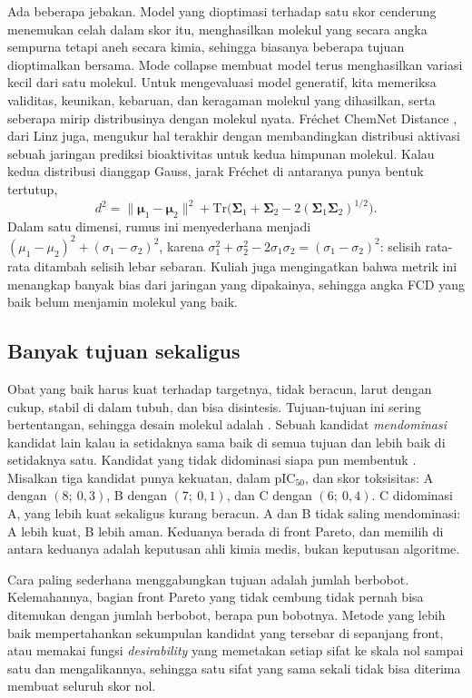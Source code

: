 Ada beberapa jebakan. Model yang dioptimasi terhadap satu skor cenderung menemukan celah dalam skor itu, menghasilkan
molekul yang secara angka sempurna tetapi aneh secara kimia, sehingga biasanya beberapa tujuan dioptimalkan bersama.
Mode collapse membuat model terus menghasilkan variasi kecil dari satu molekul. Untuk mengevaluasi model generatif, kita
memeriksa validitas, keunikan, kebaruan, dan keragaman molekul yang dihasilkan, serta seberapa mirip distribusinya dengan
molekul nyata. Fréchet ChemNet Distance \citep{preuer2018}, dari Linz juga, mengukur hal terakhir dengan membandingkan
distribusi aktivasi sebuah jaringan prediksi bioaktivitas untuk kedua himpunan molekul. Kalau kedua distribusi dianggap
Gauss, jarak Fréchet di antaranya punya bentuk tertutup,
\begin{equation}
d^2=\|\bm\mu_1-\bm\mu_2\|^2+\mathrm{Tr}\big(\bm\Sigma_1+\bm\Sigma_2-2(\bm\Sigma_1\bm\Sigma_2)^{1/2}\big).
\end{equation}
Dalam satu dimensi, rumus ini menyederhana menjadi $(\mu_1-\mu_2)^2+(\sigma_1-\sigma_2)^2$, karena
$\sigma_1^2+\sigma_2^2-2\sigma_1\sigma_2=(\sigma_1-\sigma_2)^2$: selisih rata-rata ditambah selisih lebar sebaran. Kuliah
juga mengingatkan bahwa metrik ini menangkap banyak bias dari jaringan yang dipakainya, sehingga angka FCD yang baik belum
menjamin molekul yang baik.

\subsection{Banyak tujuan sekaligus}

Obat yang baik harus kuat terhadap targetnya, tidak beracun, larut dengan cukup, stabil di dalam tubuh, dan bisa disintesis. Tujuan-tujuan
ini sering bertentangan, sehingga desain molekul adalah . Sebuah kandidat \emph{mendominasi} kandidat
lain kalau ia setidaknya sama baik di semua tujuan dan lebih baik di setidaknya satu. Kandidat yang tidak didominasi siapa pun membentuk
. Misalkan tiga kandidat punya kekuatan, dalam pIC$_{50}$, dan skor toksisitas: A dengan $(8;\ 0{,}3)$, B dengan
$(7;\ 0{,}1)$, dan C dengan $(6;\ 0{,}4)$. C didominasi A, yang lebih kuat sekaligus kurang beracun. A dan B tidak saling mendominasi:
A lebih kuat, B lebih aman. Keduanya berada di front Pareto, dan memilih di antara keduanya adalah keputusan ahli kimia medis, bukan
keputusan algoritme.

Cara paling sederhana menggabungkan tujuan adalah jumlah berbobot. Kelemahannya, bagian front Pareto yang tidak cembung tidak pernah bisa
ditemukan dengan jumlah berbobot, berapa pun bobotnya. Metode yang lebih baik mempertahankan sekumpulan kandidat yang tersebar di
sepanjang front, atau memakai fungsi \emph{desirability} yang memetakan setiap sifat ke skala nol sampai satu dan mengalikannya, sehingga
satu sifat yang sama sekali tidak bisa diterima membuat seluruh skor nol.

